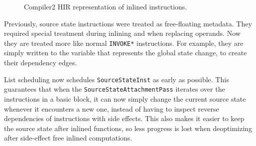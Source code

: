 \documentclass[draft,final]{vutinfth} %
\begin{document}
    \begin{figure}
        \centering
        \caption{Compiler2 HIR representation of inlined instructions.}
        \label{fig:source-states}
    \end{figure}

    Previously, source state instructions were treated as free-floating metadata.
    They required special treatment during inlining and when replacing operands.
    Now they are treated more like normal \lstinline{INVOKE*} instructions.
    For example,
    they are simply written to the variable that represents the global state change,
    to create their dependency edges.

    List scheduling now schedules \lstinline{SourceStateInst} as early as possible.
    This guarantees that when the \lstinline{SourceStateAttachmentPass} iterates over the instructions in a basic block,
    it can now simply change the current source state whenever it encounters a new one,
    instead of having to inspect reverse dependencies of instructions with side effects.
    This also makes it easier to keep the source state after inlined functions,
    so less progress is lost when deoptimizing after side-effect free inlined computations.
\end{document}
